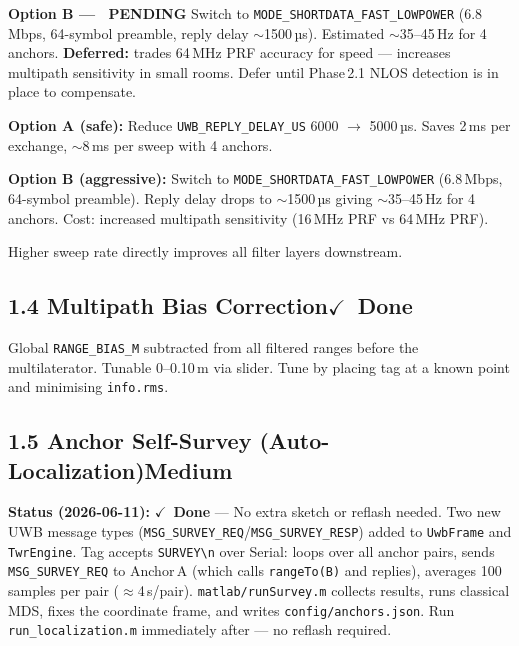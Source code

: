 \documentclass[11pt,a4paper]{article}
\newcommand{\dif}[1]{\texorpdfstring{\hfill#1}{}}
\newcommand{\medium}{\textcolor{dkorange}{\textbf{Medium}}}
\newcommand{\done}{\texorpdfstring{\textcolor{dkgreen}{$\checkmark$~\textbf{Done}}}{[Done]}}
\newcommand{\pendingopt}{\texorpdfstring{\textcolor{dkred}{\faExclamationTriangle~\textbf{PENDING}}}{[PENDING]}}
\begin{document}
\begin{warnbox}
\textbf{Option B --- \pendingopt{}} Switch to \texttt{MODE\_SHORTDATA\_FAST\_LOWPOWER} (6.8\,Mbps, 64-symbol preamble, reply delay $\sim$1500\,µs). Estimated $\sim$35--45\,Hz for 4 anchors. \textbf{Deferred:} trades 64\,MHz PRF accuracy for speed --- increases multipath sensitivity in small rooms. Defer until Phase\,2.1 NLOS detection is in place to compensate.
\end{warnbox}

\textbf{Option A (safe):} Reduce \texttt{UWB\_REPLY\_DELAY\_US} 6000 $\to$ 5000\,µs. Saves 2\,ms per exchange, $\sim$8\,ms per sweep with 4 anchors.

\textbf{Option B (aggressive):} Switch to \texttt{MODE\_SHORTDATA\_FAST\_LOWPOWER} (6.8\,Mbps, 64-symbol preamble). Reply delay drops to $\sim$1500\,µs giving $\sim$35--45\,Hz for 4 anchors. Cost: increased multipath sensitivity (16\,MHz PRF vs 64\,MHz PRF).

Higher sweep rate directly improves all filter layers downstream.

\subsection{1.4 Multipath Bias Correction\dif{\done}}

Global \texttt{RANGE\_BIAS\_M} subtracted from all filtered ranges before the multilaterator. Tunable 0--0.10\,m via slider. Tune by placing tag at a known point and minimising \texttt{info.rms}.

\subsection{1.5 Anchor Self-Survey (Auto-Localization)\dif{\medium}}

\begin{donebox}
\textbf{Status (2026-06-11):} \done{} --- No extra sketch or reflash needed. Two new UWB message types (\texttt{MSG\_SURVEY\_REQ}/\texttt{MSG\_SURVEY\_RESP}) added to \texttt{UwbFrame} and \texttt{TwrEngine}. Tag accepts \texttt{SURVEY\textbackslash n} over Serial: loops over all anchor pairs, sends \texttt{MSG\_SURVEY\_REQ} to Anchor\,A (which calls \texttt{rangeTo(B)} and replies), averages 100 samples per pair ($\approx$4\,s/pair). \texttt{matlab/runSurvey.m} collects results, runs classical MDS, fixes the coordinate frame, and writes \texttt{config/anchors.json}. Run \texttt{run\_localization.m} immediately after --- no reflash required.
\end{donebox}
\end{document}
